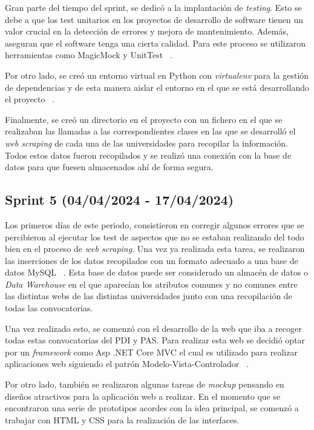 Gran parte del tiempo del sprint, se dedicó a la implantación de \textit{testing}. Esto se debe a que los test unitarios en los proyectos de desarrollo de software tienen un valor crucial en la detección de errores y mejora de mantenimiento. Además, aseguran que el software tenga una cierta calidad. Para este proceso se utilizaron herramientas como MagicMock y UnitTest ~\cite{unittest:latex}.

Por otro lado, se creó un entorno virtual en Python con \textit{virtualenv} para la gestión de dependencias y de esta manera aislar el entorno en el que se está desarrollando el proyecto ~\cite{virtualenv:latex}.

Finalmente, se creó un directorio en el proyecto con un fichero en el que se realizaban las llamadas a las correspondientes clases en las que se desarrolló el \textit{web scraping} de cada una de las universidades para recopilar la información. Todos estos datos fueron recopilados y se realizó una conexión con la base de datos para que fuesen almacenados ahí de forma segura.


\subsection{Sprint 5 (04/04/2024 -
17/04/2024)}
Los primeros días de este periodo, consistieron en corregir algunos errores que se percibieron al ejecutar los test de aspectos que no se estaban realizando del todo bien en el proceso de \textit{web scraping}. Una vez ya realizada esta tarea, se realizaron las inserciones de los datos recopilados con un formato adecuado a una base de datos MySQL ~\cite{mysqlpython:latex}. Esta base de datos puede ser considerado un almacén de datos o \textit{Data Warehouse} en el que aparecían los atributos comunes y no comunes entre las distintas webs de las distintas universidades junto con una recopilación de todas las convocatorias.

Una vez realizado esto, se comenzó con el desarrollo de la web que iba a recoger todas estas convocatorias del PDI y PAS. Para realizar esta web se decidió optar por un \textit{framework} como Asp .NET Core MVC el cual es utilizado para realizar aplicaciones web siguiendo el patrón Modelo-Vista-Controlador ~\cite{aspnetcore:latex}.

Por otro lado, también se realizaron algunas tareas de \textit{mockup} pensando en diseños atractivos para la aplicación web a realizar. En el momento que se encontraron una serie de prototipos acordes con la idea principal, se comenzó a trabajar con HTML y CSS para la realización de las interfaces.


